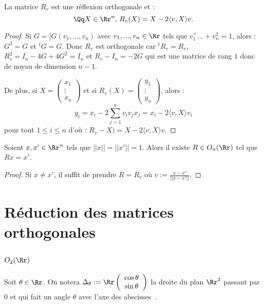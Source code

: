 \documentclass[class=report,crop=false]{standalone}
\begin{document}
\begin{proposition}
La matrice $R_v$ est une réflexion orthogonale et :
\[\Qq X \in \Rr^n,\, R_v(X) = X -2\langle v, X\rangle v .\]
\end{proposition}

\begin{proof}
Si $G= [G(v_1,...,v_n)$ avec $v_1,...,v_n \in \Rr$ tels que $v_1^+...+v_n^2 =1$, alors : $G^2=G$ et ${}^t\! G = G$. Donc $R_v$ est orthogonale car ${}^t\! R_v = R_v$, $R_v^2 =I_n -4G+4G^2 = I_n$ et $R_v - I_n = -2G$ qui est une matrice de rang $1$ donc de noyau de dimension $n-1$.

De plus, si $ X=\left(\begin{array}{c}
x_1\\
\vdots\\
x_n
\end{array}\right) $ et si $ R_v(X)=\left(\begin{array}{c}
y_1\\
\vdots\\
y_n
\end{array}\right)$, alors :
\[y_i = x_i - 2\sum_{j=1}^nv_iv_jx_j = x_i - 2\langle v,X\rangle v_i\]
pour tout $1 \le i \le n$ d'où : $R_v-X) = X-2\langle v , X \rangle v$.

\end{proof}


\begin{lemme}
Soient $x,x' \in \Rr^n$ tels que $||x||=||x'|| =1$. Alors il existe $R \in O_n(\Rr)$ tel que $Rx = x'$.
\end{lemme}

\begin{proof}
Si $x \neq x'$, il suffit de prendre $R =R_v$ où $v:=\frac{x-x'}{||x-x'||}$.
\end{proof}

\section{Réduction des matrices orthogonales}



\subsection{ \boldmath $O_2(\Rr)$}

Soit $\theta \in \Rr$. On notera $\Delta_\theta : = \Rr \left(\begin{array}{c}
\cos \theta\\
\sin \theta
\end{array}\right)$ la droite du plan $\Rr^2$ passant par $0$ et qui fait un angle $\theta$ avec \og l'axe des abscisses\fg\ .
\end{document}
